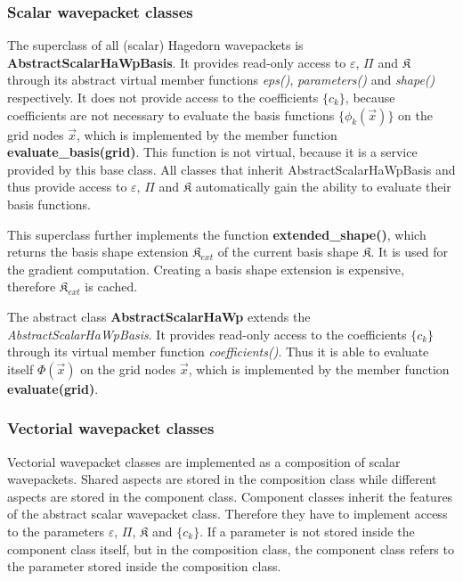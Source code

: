 \documentclass{article}
\def\classname#1{\textit{#1}}
\begin{document}
\subsubsection{Scalar wavepacket classes}

The superclass of all (scalar) Hagedorn wavepackets is \textbf{AbstractScalarHaWpBasis}.
It provides read-only access to \(\varepsilon\), \(\Pi\) and \(\mathfrak{K}\)
through its abstract virtual member functions \emph{eps()}, \emph{parameters()} and \emph{shape()}
respectively. It does not provide access to the coefficients \(\{c_k\}\), because coefficients
are not necessary to evaluate the basis functions \(\{\phi_k(\vec{x})\}\) on the grid nodes \(\vec{x}\),
which is implemented by the member function \textbf{evaluate\_basis(grid)}.
This function is not virtual, because it is a service provided by this base class.
All classes that inherit AbstractScalarHaWpBasis and thus provide access to \(\varepsilon\),
\(\Pi\) and \(\mathfrak{K}\) automatically gain the ability to evaluate their basis functions.

This superclass further implements the function \textbf{extended\-\_shape()},
which returns the basis shape extension \(\mathfrak{K}_{ext}\)
of the current basis shape \(\mathfrak{K}\). It is used for the gradient computation.
Creating a basis shape extension is expensive, therefore \(\mathfrak{K}_{ext}\) is cached.

The abstract class \textbf{AbstractScalarHaWp} extends the \classname{AbstractScalarHaWpBasis}.
It provides read-only access to the coefficients \(\{c_k\}\) through its virtual member function
\emph{coefficients()}. Thus it is able to evaluate itself \(\Phi(\vec{x})\) on the grid nodes \(\vec{x}\),
which is implemented by the member function \textbf{evaluate(grid)}.

\subsubsection{Vectorial wavepacket classes}
Vectorial wavepacket classes are implemented as a composition of scalar wave\-packets.
Shared aspects are stored in the composition class while different aspects are
stored in the component class.
Component classes inherit the features of the abstract scalar wavepacket class.
Therefore they have to implement access to the parameters \(\varepsilon\), \(\Pi\), \(\mathfrak{K}\)
and \(\{c_k\}\).
If a parameter is not stored inside the component class itself, but in the composition class,
the component class refers to the parameter stored inside the composition class.
\end{document}
